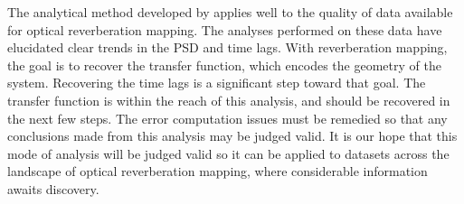 \documentclass[11pt,letterpaper]{article}
\begin{document}
The analytical method developed by \cite{2013ApJ...777...24Z} applies well to the quality of data available for optical reverberation mapping. The analyses performed on these data have elucidated clear trends in the PSD and time lags. With reverberation mapping, the goal is to recover the transfer function, which encodes the geometry of the system. Recovering the time lags is a significant step toward that goal. The transfer function is within the reach of this analysis, and should be recovered in the next few steps. The error computation issues must be remedied so that any conclusions made from this analysis may be judged valid. It is our hope that this mode of analysis will be judged valid so it can be applied to datasets across the landscape of optical reverberation mapping, where considerable information awaits discovery.

\newcommand{\mnras}{MNRAS}
\newcommand{\apj}{ApJ}
\newcommand{\aapr}{A\&ARv}
\newcommand{\nat}{Nature}


{}
\end{document}
